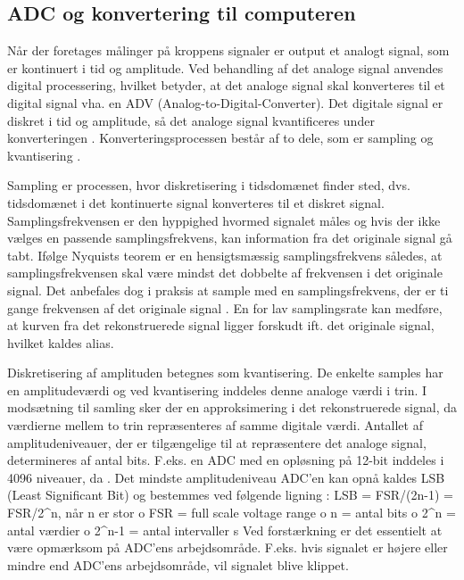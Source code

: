 \subsection{ADC og konvertering til computeren}
Når der foretages målinger på kroppens signaler er output et analogt signal, som er kontinuert i tid og amplitude. Ved behandling af det analoge signal anvendes digital processering, hvilket betyder, at det analoge signal skal konverteres til et digital signal vha. en ADV (Analog-to-Digital-Converter). Det digitale signal er diskret i tid og amplitude, så det analoge signal kvantificeres under konverteringen \cite{Webster2009}. Konverteringsprocessen består af to dele, som er sampling og kvantisering \cite{Zouridakis2003}.  

Sampling er processen, hvor diskretisering i tidsdomænet finder sted, dvs. tidsdomænet i det kontinuerte signal konverteres til et diskret signal. Samplingsfrekvensen er den hyppighed hvormed signalet måles og hvis der ikke vælges en passende samplingsfrekvens, kan information fra det originale signal gå tabt. Ifølge Nyquists teorem er en hensigtsmæssig samplingsfrekvens således, at samplingsfrekvensen skal være mindst det dobbelte af frekvensen i det originale signal. \cite{Zouridakis2003} Det anbefales dog i praksis at sample med en samplingsfrekvens, der er ti gange frekvensen af det originale signal . En for lav samplingsrate kan medføre, at kurven fra det rekonstruerede signal ligger forskudt ift. det originale signal, hvilket kaldes alias. \cite{Zouridakis2003}
 
Diskretisering af amplituden betegnes som kvantisering. De enkelte samples har en amplitudeværdi og ved kvantisering inddeles denne analoge værdi i trin. I modsætning til samling sker der en approksimering i det rekonstruerede signal, da værdierne mellem to trin repræsenteres af samme digitale værdi. \cite{Zouridakis2003} Antallet af amplitudeniveauer, der er tilgængelige til at repræsentere det analoge signal, determineres af antal bits. F.eks. en ADC med en opløsning på 12-bit inddeles i 4096 niveauer, da . \cite{Konrad2006} Det mindste amplitudeniveau ADC'en kan opnå kaldes LSB (Least Significant Bit) og bestemmes ved følgende ligning : LSB = FSR/(2n-1) = FSR/2^n, når n er stor
o	FSR = full scale voltage range
o	n = antal bits
o	2^n = antal værdier
o	2^n-1 = antal intervaller 
s
Ved forstærkning er det essentielt at være opmærksom på ADC'ens  arbejdsområde. F.eks. hvis signalet er højere eller mindre end ADC'ens arbejdsområde, vil signalet blive klippet.  
 